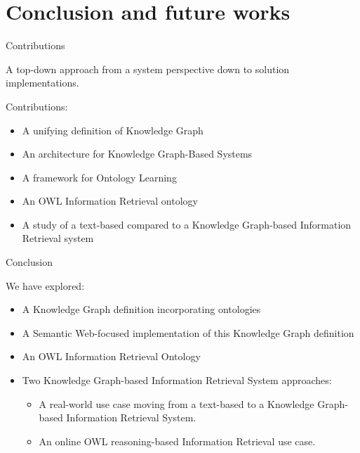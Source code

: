 \section{Conclusion and future works}

\begin{frame}{Contributions}

    \begin{center}
        A top-down approach from a system perspective down to solution implementations.
    \end{center}

    Contributions:
    \begin{itemize}
        \item A unifying definition of Knowledge Graph
        \item An architecture for Knowledge Graph-Based Systems
        \item A framework for Ontology Learning
        \item An OWL Information Retrieval ontology
        \item A study of a text-based compared to a Knowledge Graph-based Information Retrieval system
    \end{itemize}
    
\end{frame}

\begin{frame}{Conclusion}

    We have explored:
    \begin{itemize}
        \item A Knowledge Graph definition incorporating ontologies
        \item A Semantic Web-focused implementation of this Knowledge Graph definition
        \item An OWL Information Retrieval Ontology
        \item Two Knowledge Graph-based Information Retrieval System approaches:
        \begin{itemize}
            \item A real-world use case moving from a text-based to a Knowledge Graph-based Information Retrieval System.
            \item An online OWL reasoning-based Information Retrieval use case.
        \end{itemize}
    \end{itemize}

\end{frame}

